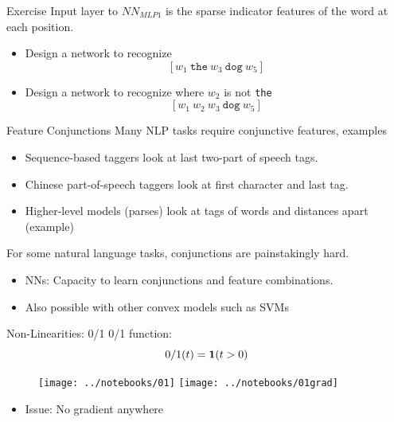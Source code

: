 \documentclass{beamer}
\begin{document}
\begin{frame}{Exercise}
  Input layer to $NN_{MLP1}$ is the sparse indicator features
  of the word at each position.

  \begin{itemize}
  \item Design a network to recognize
  \[[w_1\ \texttt{the} \ w_3\ \mathrm{\texttt{dog}} \ w_5] \]

  \item Design a network to recognize  where $w_2$ is not \texttt{the}
  \[[w_1\ w_2 \ w_3\ \mathrm{\texttt{dog}} \ w_5] \]

  \end{itemize}
\end{frame}

\begin{frame}{Feature Conjunctions}
  Many NLP tasks require conjunctive features, examples
  \begin{itemize}
  \item Sequence-based taggers look at last two-part of speech tags.
    \air

  \item Chinese part-of-speech taggers look at first character and last tag.
    \air

  \item Higher-level models (parses) look at tags of words and distances apart (example)
  \end{itemize}
  \air

  For some natural language tasks, conjunctions are painstakingly hard.

  \pause
  \begin{itemize}
  \item NNs: Capacity to learn conjunctions and feature combinations.
    \air

  \item Also possible with other convex models such as SVMs
  \end{itemize}
\end{frame}

{


}


\begin{frame}{Non-Linearities: 0/1}
  0/1 function:
  \[0/1(t) = \mathbf{1}(t > 0) \]
  \begin{figure}
    \centering
    \texttt{[image: ../notebooks/01]}
    \texttt{[image: ../notebooks/01grad]}
  \end{figure}

  \begin{itemize}
  \item Issue: No gradient anywhere
  \end{itemize}
\end{frame}
\end{document}
